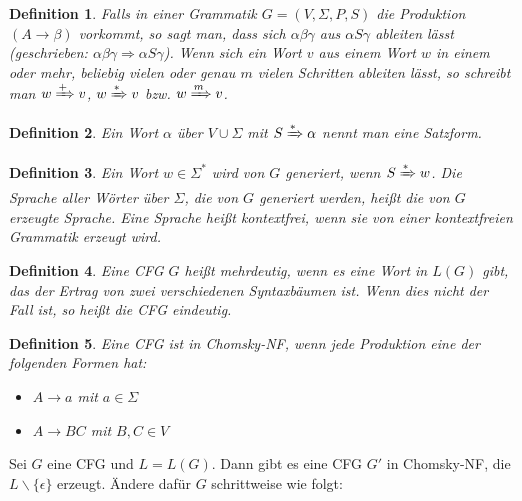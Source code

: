 \documentclass{cheat-sheet}
\newtheorem*{definition}{Definition}
\begin{document}
\begin{definition}
Falls in einer Grammatik $G = (V, \Sigma, P, S)$ die Produktion $(A \longrightarrow \beta)$ vorkommt, so sagt man, dass sich $\alpha \beta \gamma$ aus $\alpha S \gamma$ \emph{ableiten} lässt (geschrieben: $\alpha \beta \gamma \Rightarrow \alpha S \gamma $). Wenn sich ein Wort $v$ aus einem Wort $w$ in einem oder mehr, beliebig vielen oder genau $m$ vielen Schritten ableiten lässt, so schreibt man $w \xRightarrow{+} v$, $w \xRightarrow{*} v$ bzw. $w \xRightarrow{m} v$.
\end{definition}

\begin{definition}
Ein Wort $\alpha$ über $V \cup \Sigma$ mit $S \xRightarrow{*} \alpha$ nennt man eine \emph{Satzform}.
\end{definition}

\begin{definition}
Ein Wort $w \in \Sigma^{*}$ wird von $G$ \emph{generiert}, wenn $S \xRightarrow[]{*} w$. Die Sprache aller Wörter über $\Sigma$, die von $G$ generiert werden, heißt die von $G$ erzeugte Sprache. Eine Sprache heißt \emph{kontextfrei}, wenn sie von einer kontextfreien Grammatik erzeugt wird.
\end{definition}


\begin{definition}
  Eine CFG $G$ heißt \emph{mehrdeutig}, wenn es eine Wort in $L(G)$ gibt, das der Ertrag von zwei verschiedenen Syntaxbäumen ist. Wenn dies nicht der Fall ist, so heißt die CFG \emph{eindeutig}.
\end{definition}

\fbox{
  \begin{minipage}{8.5cm}
    \hfill\vspace{2.5cm}
  \end{minipage}
}

\begin{definition}
  Eine CFG ist in \emph{Chomsky-NF}, wenn jede Produktion eine der folgenden Formen hat:
  \begin{itemize}
    \item $A \longrightarrow a$ mit $a \in \Sigma$
    \item $A \longrightarrow BC$ mit $B, C \in V$
  \end{itemize}
\end{definition}

\begin{alg}
Sei $G$ eine CFG und $L = L(G)$. Dann gibt es eine CFG $G'$ in Chomsky-NF, die $L \backslash \{ \epsilon \}$ erzeugt. Ändere dafür $G$ schrittweise wie folgt:
\end{alg}
\end{document}
